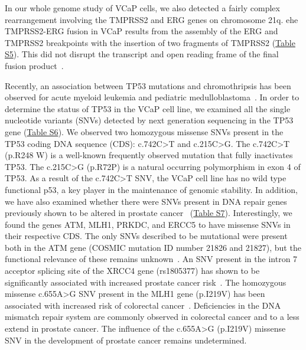 In our whole genome study of VCaP cells, we also detected a fairly complex rearrangement involving the TMPRSS2 and ERG genes on chromosome 21q\@.
ehe TMPRSS2-ERG fusion in VCaP results from the assembly of the ERG and TMPRSS2 breakpoints with the insertion of two fragments of TMPRSS2 (\href{https://link.springer.com/article/10.1007/s00439-013-1308-1#SupplementaryMaterial}{Table S5}).
This did not disrupt the transcript and open reading frame of the final fusion product~\cite{mertz2007molecular}.

Recently, an association between TP53 mutations and chromothripsis has been observed for acute myeloid leukemia and pediatric
medulloblastoma~\cite{rausch2012genome}. In order to determine the status of TP53 in the VCaP cell line, we examined all the single
nucleotide variants (SNVs) detected by next generation sequencing in the TP53 gene (\href{https://link.springer.com/article/10.1007/s00439-013-1308-1#SupplementaryMaterial}{Table S6}). We observed two homozygous missense
SNVs present in the TP53 coding DNA sequence (CDS): c.742C>T and c.215C>G. The c.742C>T (p.R248 W) is a well-known frequently
observed mutation that fully inactivates TP53. The c.215C>G (p.R72P) is a natural occurring polymorphism in exon 4 of TP53.
As a result of the c.742C>T SNV, the VCaP cell line has no wild type functional p53, a key player in the maintenance of genomic
stability. In addition, we have also examined whether there were SNVs present in DNA repair genes previously shown to be altered
in prostate cancer~\cite{grasso2012mutational} (\href{https://link.springer.com/article/10.1007/s00439-013-1308-1#SupplementaryMaterial}{Table S7}). Interestingly, we found the genes ATM, MLH1, PRKDC, and ERCC5 to have missense
SNVs in their respective CDS\@. The only SNVs described to be mutational were present both in the ATM gene (COSMIC mutation ID number
21826 and 21827), but the functional relevance of these remains unknown~\cite{gumy2006atm}. An SNV present in the intron 7
acceptor splicing site of the XRCC4 gene (rs1805377) has shown to be significantly associated with increased prostate cancer risk~\cite{mandal2011polymorphisms}. The homozygous missense c.655A>G SNV present in the MLH1 gene (p.I219V) has been associated with increased
risk of colorectal cancer~\cite{campbell2009mismatch}. Deficiencies in the DNA mismatch repair system are commonly observed in colorectal
cancer and to a less extend in prostate cancer. The influence of the c.655A>G (p.I219V) missense SNV in the development of prostate
cancer remains undetermined.

